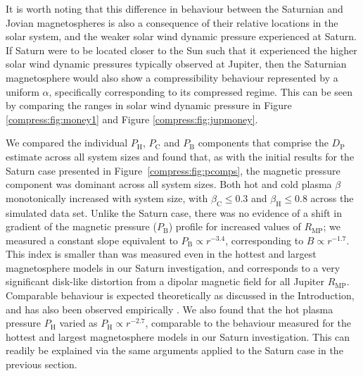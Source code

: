 It is worth noting that this difference in behaviour between the Saturnian and Jovian magnetospheres is also a consequence of their relative locations in the solar system, and the weaker solar wind dynamic pressure experienced at Saturn. If Saturn were to be located closer to the Sun such that it experienced the higher solar wind dynamic pressures typically observed at Jupiter, then the Saturnian magnetosphere would also show a compressibility behaviour represented by a uniform $\alpha$, specifically corresponding to its compressed regime. This can be seen by comparing the ranges in solar wind dynamic pressure in Figure \ref{compress:fig:money1} and Figure \ref{compress:fig:jupmoney}.

We compared the individual $P_\mathrm{H}$, $P_\mathrm{C}$ and $P_\mathrm{B}$ components that comprise the $D_\mathrm{P}$ estimate across all system sizes and found that, as with the initial results for the Saturn case presented in Figure~\ref{compress:fig:pcomps}, the magnetic pressure component was dominant across all system sizes. Both hot and cold plasma $\beta$ monotonically increased with system size, with $\beta_\mathrm{C} \leq 0.3$ and $\beta_\mathrm{H} \leq 0.8$ across the simulated data set. Unlike the Saturn case, there was no evidence of a shift in gradient of the magnetic pressure ($P_\mathrm{B}$) profile for increased values of $R_\mathrm{MP}$; we measured a constant slope equivalent to $P_\mathrm{B}\propto r^{-3.4}$, corresponding to $B\propto r^{-1.7}$. This index is smaller than was measured even in the hottest and largest magnetosphere models in our Saturn investigation, and corresponds to a very significant disk-like distortion from a dipolar magnetic field for all Jupiter $R_\mathrm{MP}$. Comparable behaviour is expected theoretically as discussed in the Introduction, and has also been observed empirically \cite[e.g.][]{khurana1989}. We also found that the hot plasma pressure $P_\mathrm{H}$ varied as $P_\mathrm{H} \propto r^{-2.7}$, comparable to the behaviour measured for the hottest and largest magnetosphere models in our Saturn investigation. This can readily be explained via the same arguments applied to the Saturn case in the previous section.

